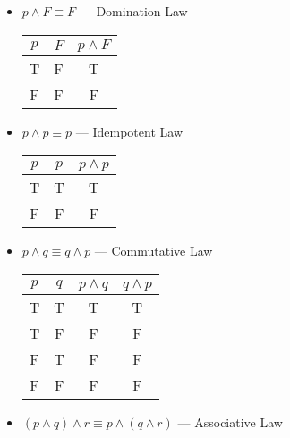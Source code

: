 \begin{itemize}
  \item $p\wedge F\equiv F$ — Domination Law

    \begin{center}
      \begin{tabular}[h]{|c|c|c|}
        \hline
        $p$ & $F$ & $p\wedge F$\\
        \hline
        T & F & T\\
        \hline
        F & F & F\\
        \hline
      \end{tabular}
    \end{center}

  \item $p\wedge p\equiv p$ — Idempotent Law

    \begin{center}
      \begin{tabular}[h]{|c|c|c|}
        \hline
        $p$ & $p$ & $p\wedge p$\\
        \hline
        T & T & T\\
        \hline
        F & F & F\\
        \hline
      \end{tabular}
    \end{center}

  \item $p\wedge q\equiv q\wedge p$ — Commutative Law

    \begin{center}
      \begin{tabular}[h]{|c|c|c|c|}
        \hline
        $p$ & $q$ & $p\wedge q$ & $q\wedge p$\\
        \hline
        T & T & T & T\\
        \hline
        T & F & F & F\\
        \hline
        F & T & F & F\\
        \hline
        F & F & F & F\\
        \hline
      \end{tabular}
    \end{center}

  \item $(p\wedge q)\wedge r\equiv p\wedge (q\wedge r)$ — Associative Law


\end{itemize}
